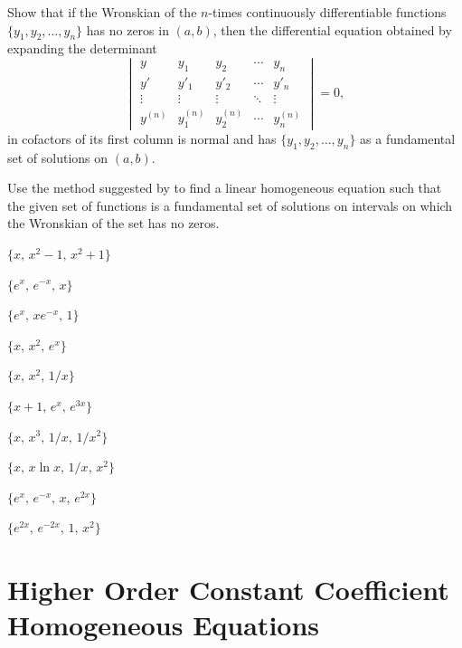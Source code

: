 \begin{exerciselist}
\item\label{exer:9.1.23}Show that if the Wronskian of the $n$-times continuously
differentiable functions $\{y_1,y_2,\dots,y_n\}$ has no zeros in
$(a,b)$, then the differential equation obtained by expanding the
determinant
\[
\begin{vmatrix}
y&y_1&y_2&\cdots&y_n\\
y'&y'_1&y'_2&\cdots&y'_n\\
\vdots&\vdots&\vdots&\ddots& \vdots\\
y^{(n)}&y_{1}^{(n)}&y_2^{(n)}&\cdots&y_n^{(n)}
\end{vmatrix}=0,
\]
in cofactors of its first column is normal and has
$\{y_1,y_2,\dots,y_n\}$ as a fundamental set of solutions on $(a,b)$.

\item\label{exer:9.1.24}Use the method suggested by   to find a linear
homogeneous equation such that the given set of functions
is a fundamental set of solutions on intervals on which the Wronskian
of the set has no zeros.
\begin{alist*}[columns=2,beginpenalty={5000}]
\item $\{x,\,x^2-1,\,x^2+1\}$
\item $\{e^x,\,e^{-x},\,x\}$
\item $\{e^x,\,xe^{-x},\,1\}$
\item $\{x,\,x^2,\,e^x\}$
\item $\{x,\,x^2,\,1/x\}$
\item $\{x+1,\,e^x,\,e^{3x}\}$
\item $\{x,\,x^3,\,1/x,\,1/x^2\}$
\item $\{x,\,x\ln x,\,1/x,\,x^2\}$
\item $\{e^x,\,e^{-x},\,x,\,e^{2x}\}$
\item $\{e^{2x},\,e^{-2x},\,1,\,x^2\}$
\end{alist*}

\end{exerciselist}


\section{Higher Order Constant Coefficient Homogeneous Equations}
\label{sec:higher_const_coeff}

